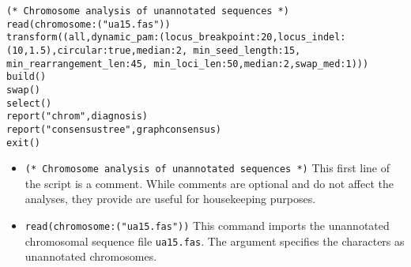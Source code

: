 \begin{verbatim}
(* Chromosome analysis of unannotated sequences *)
read(chromosome:("ua15.fas"))
transform((all,dynamic_pam:(locus_breakpoint:20,locus_indel:
(10,1.5),circular:true,median:2, min_seed_length:15, 
min_rearrangement_len:45, min_loci_len:50,median:2,swap_med:1)))
build()
swap()
select()
report("chrom",diagnosis)
report("consensustree",graphconsensus)
exit()
\end{verbatim}

\begin{itemize}
\item \texttt{(* Chromosome analysis of unannotated sequences *)} This first line of the script is a comment. While comments are optional and do not affect the analyses, they provide are useful for housekeeping purposes.
\item \texttt{read(chromosome:("ua15.fas"))} This command imports the unannotated chromosomal sequence file \texttt{ua15.fas}. The argument  specifies the characters as unannotated chromosomes.

\end{itemize}
